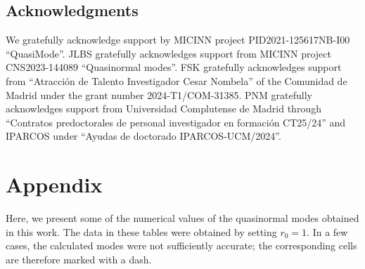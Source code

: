\documentclass[11pt,a4paper]{article}
\begin{document}


\subsection*{Acknowledgments}

We gratefully acknowledge support by MICINN project PID2021-125617NB-I00 ``QuasiMode''.
JLBS gratefully acknowledges support from MICINN project CNS2023-144089 ``Quasinormal modes''.
FSK gratefully acknowledges support from ``Atracci\'on de Talento Investigador Cesar Nombela'' of the Comunidad de Madrid under the grant number 2024-T1/COM-31385.
PNM gratefully acknowledges support from Universidad Complutense de Madrid through ``Contratos predoctorales de personal investigador en formación CT25/24'' and IPARCOS under ``Ayudas de doctorado IPARCOS-UCM/2024''.








\section*{Appendix}


Here, we present some of the numerical values of the quasinormal modes obtained in this work. The data in these tables were obtained by setting
$r_0=1$. 
In a few cases, the calculated modes were not sufficiently accurate;
the corresponding cells are therefore marked with a dash.

\end{document}

